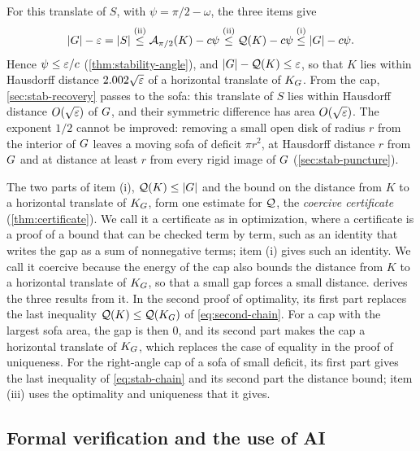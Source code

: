 For this translate of $S$, with $\psi=\pi/2-\omega$, the three items give
\begin{equation}\label{eq:stab-chain}
  \lvert G\rvert-\varepsilon=\lvert S\rvert\overset{\text{(ii)}}{\le}\mathcal{A}_{\pi/2}(K)-c\psi
    \overset{\text{(ii)}}{\le}\mathcal{Q}(K)-c\psi\overset{\text{(i)}}{\le}\lvert G\rvert-c\psi .
\end{equation}
Hence $\psi\le\varepsilon/c$ (\cref{thm:stability-angle}), and
$\lvert G\rvert-\mathcal{Q}(K)\le\varepsilon$, so that $K$ lies within Hausdorff distance
$2.002\sqrt{\varepsilon}$ of a horizontal translate of $K_G$. From the cap,
\cref{sec:stab-recovery} passes to the sofa: this translate of $S$ lies within
Hausdorff distance $O(\sqrt{\varepsilon})$ of $G$, and their symmetric difference has
area $O(\sqrt{\varepsilon})$. The exponent $1/2$ cannot be improved: removing a small
open disk of radius $r$ from the interior of $G$ leaves a moving sofa of
deficit $\pi r^2$, at Hausdorff distance $r$ from $G$ and at distance at least
$r$ from every rigid image of $G$ (\cref{sec:stab-puncture}).

 The two parts of item (i),
$\mathcal{Q}(K)\le\lvert G\rvert$ and the bound on the distance from $K$ to a horizontal
translate of $K_G$, form one estimate for $\mathcal{Q}$, the \emph{coercive
certificate} (\cref{thm:certificate}). We call it a certificate as in
optimization, where a certificate is a proof of a bound that can be checked term
by term, such as an identity that writes the gap as a sum of nonnegative terms;
item (i) gives such an identity. We call it coercive because the energy of the
cap also bounds the distance from $K$ to a horizontal translate of $K_G$, so
that a small gap forces a small distance.  derives the three
results from it. In the second proof of optimality, its first part replaces the
last inequality $\mathcal{Q}(K)\le\mathcal{Q}(K_G)$ of \eqref{eq:second-chain}. For a cap with
the largest sofa area, the gap is then $0$, and its second part makes the cap a
horizontal translate of $K_G$, which replaces the case of equality in the proof
of uniqueness. For the right-angle cap of a sofa of small deficit, its first part
gives the last inequality of \eqref{eq:stab-chain} and its second part the
distance bound; item (iii) uses the optimality and uniqueness that it gives.

\subsection{Formal verification and the use of AI}

